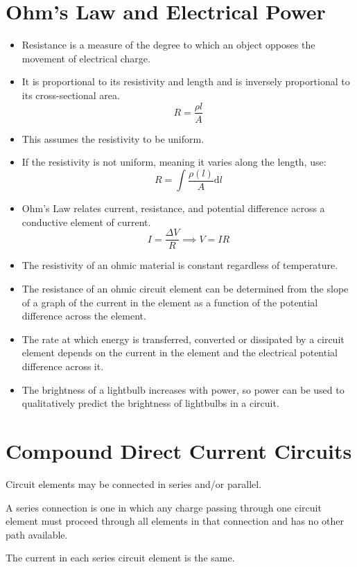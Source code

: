 \documentclass[../em.tex]{subfiles}
\begin{document}
\section{Ohm's Law and Electrical Power}
\begin{itemize}
    \item Resistance is a measure of the degree to which an object opposes the movement of electrical charge.
    \item It is proportional to its resistivity and length and is inversely proportional to its cross-sectional area.
    \[R=\frac{\rho l}{A}\]
    \item This assumes the resistivity to be uniform.
    
    \item If the resistivity is not uniform, meaning it varies along the length, use:
    \[R=\int{\frac{\rho(l)}{A}}\mathrm{d}l\]

    \item Ohm's Law relates current, resistance, and potential difference across a conductive element of current.
    \[I=\frac{\Delta V}{R}\implies V = IR\]

    \item The resistivity of an ohmic material is constant regardless of temperature.
    
    \item The resistance of an ohmic circuit element can be determined from the slope of a graph of the current in the element as a function of the potential difference across the element.
    \item The rate at which energy is transferred, converted or dissipated by a circuit element depends on the current in the element and the electrical potential difference across it.
    \item The brightness of a lightbulb increases with power, so power can be used to qualitatively predict the brightness of lightbulbs in a circuit.
\end{itemize}
\section{Compound Direct Current Circuits}
Circuit elements may be connected in series and/or parallel.

A series connection is one in which any charge passing through one circuit element must proceed through all elements in that connection and has no other path available.

The current in each series circuit element is the same.
\end{document}
